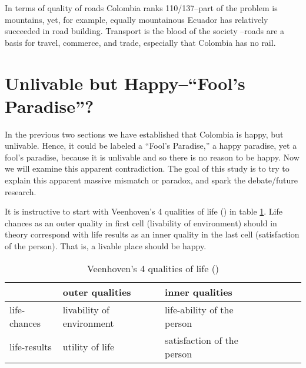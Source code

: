 \documentclass[10pt, letterpaper]{article}
\begin{document}
\begin{spacing}{2}
In terms of quality of roads Colombia ranks 110/137--part of the problem is
mountains, yet, for example, equally mountainous Ecuador has relatively succeeded in road
building. %
Transport is the blood of the society \citep[e.g.,][]{devos13}--roads are a
basis for travel, commerce, and trade, especially that Colombia has no rail. 


\section{%
  Unlivable but Happy--``Fool's Paradise''?%
}

In the previous two sections we have established that Colombia is happy, but
unlivable. Hence, it could be labeled a ``Fool's Paradise,'' a happy paradise,
yet a fool's paradise, because it is unlivable and so there is no reason to be
happy. 
 Now we will examine this apparent contradiction.  The goal of this study is to try to explain
 this apparent massive mismatch or paradox, and spark the debate/future research.  %
 
It is instructive to start with Veenhoven's 4 qualities of life
(\citeyear{veenhoven00b}) in table \ref{t4}. Life chances as an outer quality in
first cell (livability of environment) should in theory correspond with life
results as an inner quality in the last cell (satisfaction of the person). That is, a livable place should be happy. 


\begin{table}[h!]
  \centering
  \begin{tabular}{l|llllll}
\hline          &outer qualities&inner qualities\\\hline
    life-chances&livability of environment&life-ability of the person\\
    life-results&utility of life&satisfaction of the person\\\hline
  \end{tabular}
  \caption{Veenhoven's 4 qualities of life
    (\citeyear{veenhoven00b}) }
  \label{t4}
\end{table}




\end{spacing}
\end{document}
